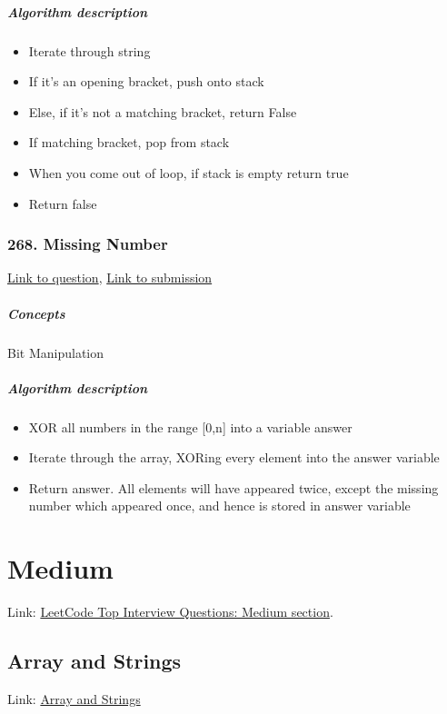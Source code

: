 \documentclass[11pt]{book}
\begin{document}
\paragraph{Algorithm description}
\begin{itemize}
    \item Iterate through string
    \item If it's an opening bracket, push onto stack
    \item Else, if it's not a matching bracket, return False
    \item If matching bracket, pop from stack
    \item When you come out of loop, if stack is empty return true
    \item Return false
\end{itemize}

\subsection{268. Missing Number}
\href{https://leetcode.com/problems/missing-number/}{Link to question},
\href{https://leetcode.com/submissions/detail/335861817/}{Link to submission}
\paragraph{Concepts}
Bit Manipulation
\paragraph{Algorithm description}
\begin{itemize}
    \item XOR all numbers in the range [0,n] into a variable answer
    \item Iterate through the array, XORing every element into the answer variable
    \item Return answer. All elements will have appeared twice, except the missing number
    which appeared once, and hence is stored in answer variable 
\end{itemize}

\chapter{Medium}
Link: \href{https://leetcode.com/explore/interview/card/top-interview-questions-medium/}{LeetCode Top Interview Questions: Medium section}.

\section{Array and Strings}
Link: \href{https://leetcode.com/explore/interview/card/top-interview-questions-medium/103/array-and-strings/}{Array and Strings}
\end{document}
